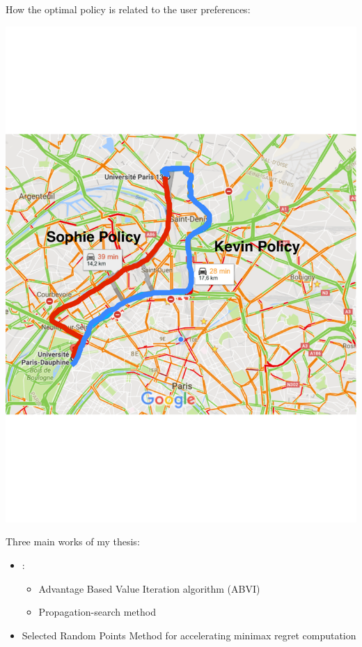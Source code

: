 \documentclass{beamer}
\newcommand{\remark}[1]{{\color{blue}{#1}}}
\begin{document}
\begin{frame}{How the optimal policy is related to the user preferences:}
\begin{center}
\includegraphics[scale=0.26]{figures-new/user-choise-new}
\end{center}
\end{frame}

\begin{frame}
Three main works of my thesis:

\begin{itemize}
 \item \remark{Elicitation}: 
	\begin{itemize}
	\item  Advantage Based Value Iteration algorithm (ABVI)
	 \item Propagation-search method
\end{itemize}	 
 \item \remark{Robust Policy} Selected Random Points Method for accelerating minimax regret computation
\end{itemize}

\end{frame}
\end{document}
